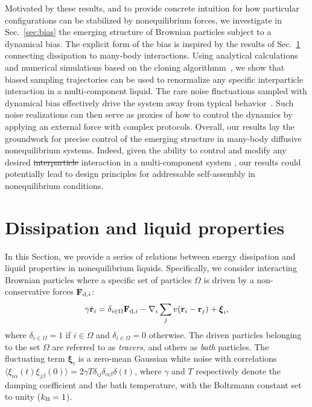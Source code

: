 \documentclass[superscriptaddress, twocolumn, prx, longbibliography, nofootinbib]{revtex4-1}
\providecommand{\DIFaddtex}[1]{{\protect\color{blue}\uwave{#1}}} %
\providecommand{\DIFdeltex}[1]{{\protect\color{red}\sout{#1}}}                      %
\providecommand{\DIFaddbegin}{} %
\providecommand{\DIFaddend}{} %
\providecommand{\DIFdelbegin}{} %
\providecommand{\DIFdelend}{} %
\providecommand{\DIFadd}[1]{\texorpdfstring{\DIFaddtex{#1}}{#1}} %
\providecommand{\DIFdel}[1]{\texorpdfstring{\DIFdeltex{#1}}{}} %
\begin{document}
Motivated by these results, and to provide concrete intuition for how particular configurations can be stabilized by nonequilibrium forces, we investigate in Sec.~\ref{sec:bias} the emerging structure of Brownian particles subject to a dynamical bias. The explicit form of the bias is inspired by the results of Sec.~\ref{sec:method} connecting dissipation to many-body interactions. Using analytical calculations and numerical simulations based on the cloning algorithmm~\cite{Giadina2006, tailleur2007probing, Hurtado2009, Nemoto2016, Ray2018, Klymko2018, Brewer2018}, we show that biased sampling trajectories can be used to renormalize any specific interparticle interaction in a multi-component liquid. The rare noise fluctuations sampled with dynamical bias effectively drive the system away from typical behavior~\cite{garrahan2007, Hedges2009, Jack2010, Pitard2011, Speck2012, Bodineau2012a, Chetrite2013, Limmer2014, Nemoto2017}. Such noise realizations can then serve as proxies of how to control the dynamics by applying an external force with complex protocols. Overall, our results lay the groundwork for precise control of the emerging structure \DIFaddbegin \DIFadd{and collective dynamics }\DIFaddend in many-body diffusive nonequilibrium systems. Indeed, \DIFdelbegin %
\DIFdelend given the ability to control and modify any desired \DIFdelbegin \DIFdel{interparticle }\DIFdelend \DIFaddbegin \DIFadd{particle }\DIFaddend interaction in a multi-component system\DIFdelbegin %
\DIFdelend , our results could potentially lead to design principles for addressable self-assembly in nonequilibrium conditions.




\section{Dissipation and liquid properties}\label{sec:method}

In this Section, we provide a series of relations between energy dissipation and liquid properties in nonequilibrium liquids. Specifically, we consider interacting Brownian particles where a specific set of particles $\Omega$ is driven by a non-conservative forces ${\bf F}_{{\rm d},i}$:
\begin{equation}\label{eq:dyn}
	\gamma\dot{\bf r}_i = \delta_{i\in\Omega}{\bf F}_{{\rm d},i} - \nabla_i \sum_j v({\bf r}_i-{\bf r}_j) + {\boldsymbol\xi}_i ,
\end{equation}
where $\delta_{i\in\Omega}=1$ if $i\in\Omega$ and $\delta_{i\in\Omega}=0$ otherwise. The driven particles belonging to the set $\Omega$ are referred to as {\it tracers}, and others as {\it bath} particles. The fluctuating term ${\boldsymbol\xi}_i$ is a zero-mean Gaussian white noise with correlations $\langle\xi_{i\alpha}(t)\xi_{j\beta}(0)\rangle=2\gamma T\delta_{ij}\delta_{\alpha\beta}\delta(t)$, where $\gamma$ and $T$ respectively denote the damping coefficient and the bath temperature, with the Boltzmann constant set to unity ($k_{\rm B}=1$). 
\end{document}
